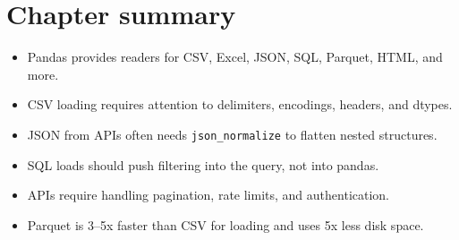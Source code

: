 \section{Chapter summary}

\begin{itemize}
  \item Pandas provides readers for CSV, Excel, JSON, SQL, Parquet, HTML, and more.
  \item CSV loading requires attention to delimiters, encodings, headers, and dtypes.
  \item JSON from APIs often needs \texttt{json\_normalize} to flatten nested structures.
  \item SQL loads should push filtering into the query, not into pandas.
  \item APIs require handling pagination, rate limits, and authentication.
  \item Parquet is 3--5x faster than CSV for loading and uses 5x less disk space.
\end{itemize}
